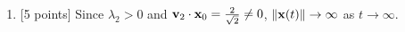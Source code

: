 \begin{solution}
\begin{enumerate}
\item {[5 points]} Since $\lambda_2>0$ and ${\bf v}_2\cdot{\bf x}_0={2\over\sqrt{2}}\ne0$, $\|{\bf x}(t)\|\rightarrow\infty$ as $t\rightarrow\infty$.
\end{enumerate}
\end{solution}